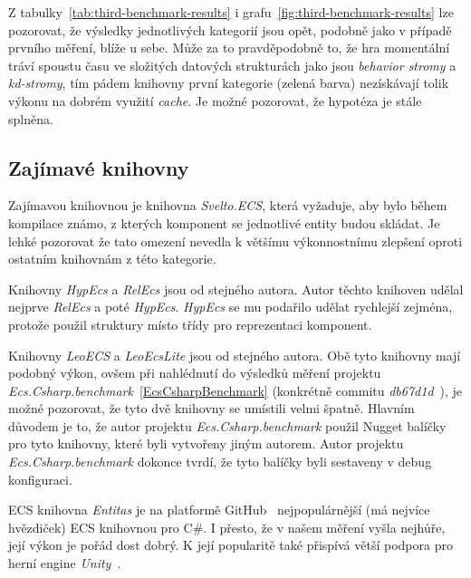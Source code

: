 Z tabulky~\ref{tab:third-benchmark-results} i grafu~\ref{fig:third-benchmark-results} lze pozorovat, že výsledky jednotlivých kategorií jsou opět, podobně jako v případě prvního měření, blíže u sebe. Může za to pravděpodobně to, že hra momentální tráví spoustu času ve složitých datových strukturách jako jsou \textit{behavior stromy} a \textit{kd-stromy}, tím pádem knihovny první kategorie (zelená barva) nezískávají tolik výkonu na dobrém využití \textit{cache}. Je možné pozorovat, že hypotéza je stále splněna.

\newpage

\subsection{Zajímavé knihovny}
Zajímavou knihovnou je knihovna \textit{Svelto.ECS}, která vyžaduje, aby bylo během kompilace známo, z kterých komponent se jednotlivé entity budou skládat. Je lehké pozorovat že tato omezení nevedla k většímu výkonnostnímu zlepšení oproti ostatním knihovnám z této kategorie.

Knihovny \textit{HypEcs} a \textit{RelEcs} jsou od stejného autora. Autor těchto knihoven udělal nejprve \textit{RelEcs} a poté \textit{HypEcs}. \textit{HypEcs} se mu podařilo udělat rychlejší zejména, protože použil struktury místo třídy pro reprezentaci komponent.

Knihovny \textit{LeoECS} a \textit{LeoEcsLite} jsou od stejného autora. Obě tyto knihovny mají podobný výkon, ovšem při nahlédnutí do výsledků měření projektu \textit{Ecs.Csharp.benchmark}~\ref{EcsCsharpBenchmark} (konkrétně commitu \textit{db67d1d}~\cite{EcsCsharpBenchmarkCommit}), je možné pozorovat, že tyto dvě knihovny se umístili velmi špatně. Hlavním důvodem je to, že autor projektu \textit{Ecs.Csharp.benchmark} použil Nugget balíčky pro tyto knihovny, které byli vytvořeny jiným autorem. Autor projektu \textit{Ecs.Csharp.benchmark} dokonce tvrdí, že tyto balíčky byli sestaveny v debug konfiguraci.

ECS knihovna \textit{Entitas} je na platformě GitHub~\cite{GitHub} nejpopulárnější (má nejvíce hvězdiček) ECS knihovnou pro C\#. I přesto, že v našem měření vyšla nejhůře, její výkon je pořád dost dobrý. K její popularitě také přispívá větší podpora pro herní engine \textit{Unity}~\cite{Unity}.